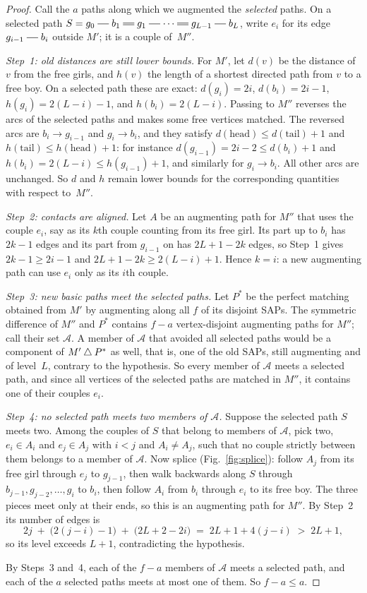 \begin{proof}
Call the $a$ paths along which we augmented the \emph{selected} paths.
On a selected path $S=g_0\sg b_1\db g_1\sg\cdots\db g_{L-1}\sg b_L$, write
$e_i$ for its edge $g_{i-1}\sg b_i$ outside $M'$; it is a couple of~$M''$.

\emph{Step~1: old distances are still lower bounds.} For $M'$, let $d(v)$
be the distance of $v$ from the free girls, and $h(v)$ the length of a
shortest directed path from $v$ to a free boy. On a selected path these
are exact: $d(g_i)=2i$, $d(b_i)=2i-1$, $h(g_i)=2(L-i)-1$, and
$h(b_i)=2(L-i)$. Passing to $M''$ reverses the arcs of the selected paths
and makes some free vertices matched. The reversed arcs are $b_i\to
g_{i-1}$ and $g_i\to b_i$, and they satisfy $d(\text{head})\le
d(\text{tail})+1$ and $h(\text{tail})\le h(\text{head})+1$: for instance
$d(g_{i-1})=2i-2\le d(b_i)+1$ and $h(b_i)=2(L-i)\le h(g_{i-1})+1$, and
similarly for $g_i\to b_i$. All other arcs are unchanged. So $d$ and $h$
remain lower bounds for the corresponding quantities with respect
to~$M''$.

\emph{Step~2: contacts are aligned.} Let $A$ be an augmenting path for
$M''$ that uses the couple $e_i$, say as its $k$th couple counting from its
free girl. Its part up to $b_i$ has $2k-1$ edges and its part from
$g_{i-1}$ on has $2L+1-2k$ edges, so Step~1 gives $2k-1\ge2i-1$ and
$2L+1-2k\ge2(L-i)+1$. Hence $k=i$: a new augmenting path can use $e_i$ only
as its $i$th couple.

\emph{Step~3: new basic paths meet the selected paths.} Let $P^*$ be the
perfect matching obtained from $M'$ by augmenting along all $f$ of its
disjoint SAPs. The symmetric difference of $M''$ and $P^*$ contains $f-a$
vertex-disjoint augmenting paths for $M''$; call their set $\mathcal A$.
A member of $\mathcal A$ that avoided all selected paths would be a
component of $M'\mathbin{\triangle} P^*$ as well, that is, one of the old SAPs, still
augmenting and of level~$L$, contrary to the hypothesis. So every member
of $\mathcal A$ meets a selected path, and since all vertices of the
selected paths are matched in $M''$, it contains one of their couples
$e_i$.

\emph{Step~4: no selected path meets two members of $\mathcal A$.}
Suppose the selected path $S$ meets two. Among the couples of $S$ that
belong to members of $\mathcal A$, pick two, $e_i\in A_i$ and $e_j\in A_j$
with $i<j$ and $A_i\ne A_j$, such that no couple strictly between them
belongs to a member of $\mathcal A$. Now splice (Fig.~\ref{fig:splice}):
follow $A_j$ from its free girl through $e_j$ to $g_{j-1}$, then walk
backwards along $S$ through $b_{j-1},g_{j-2},\ldots,g_i$ to $b_i$, then
follow $A_i$ from $b_i$ through $e_i$ to its free boy. The three pieces
meet only at their ends, so this is an augmenting path for $M''$. By
Step~2 its number of edges is
\[
  2j\;+\;\bigl(2(j-i)-1\bigr)\;+\;\bigl(2L+2-2i\bigr)\;=\;2L+1+4(j-i)\;>\;2L+1,
\]
so its level exceeds $L+1$, contradicting the hypothesis.

By Steps~3 and~4, each of the $f-a$ members of $\mathcal A$ meets a
selected path, and each of the $a$ selected paths meets at most one of
them. So $f-a\le a$.
\end{proof}

